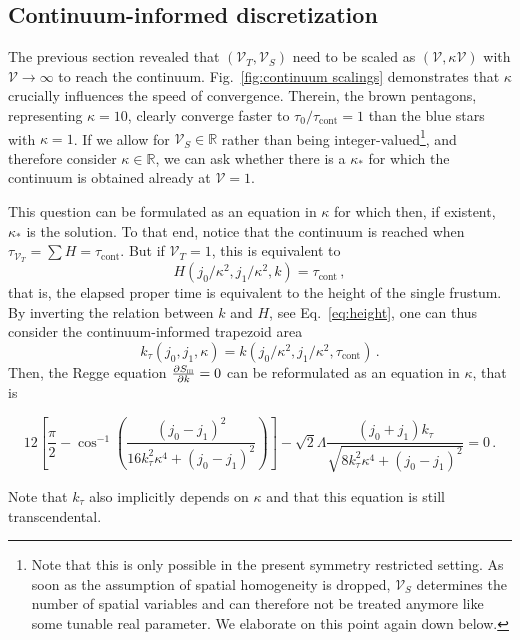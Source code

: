 \documentclass[amsmath,amssymb,aps,twocolumn,superscriptaddress,nofootinbib]{revtex4-1}
\newcommand{\R}{\mathbb{R}}
\begin{document}
\subsection{Continuum-informed discretization}

The previous section revealed that $(\mathcal{V}_T,\mathcal{V}_S)$ need to be scaled as $(\mathcal{V},\kappa\mathcal{V})$ with $\mathcal{V}\rightarrow\infty$ to reach the continuum.
Fig.~\ref{fig:continuum scalings} demonstrates that $\kappa$ crucially influences the speed of convergence. 
Therein, the brown pentagons, representing $\kappa=10$, clearly converge faster to $\tau_0/\tau_{\mathrm{cont}} = 1$ than the blue stars with $\kappa=1$. 
If we allow for $\mathcal{V}_S\in\R$ rather than being integer-valued\footnote{Note that this is only possible in the present symmetry restricted setting. As soon as the assumption of spatial homogeneity is dropped, $\mathcal{V}_S$ determines the number of spatial variables and can therefore not be treated anymore like some tunable real parameter. We elaborate on this point again down below.}, and therefore consider $\kappa\in\R$, we can ask whether there is a $\kappa_*$ for which the continuum is obtained already at $\mathcal{V}=1$.

This question can be formulated as an equation in $\kappa$ for which then, if existent, $\kappa_*$ is the solution.
To that end, notice that the continuum is reached when $\tau_{\mathcal{V}_T} = \sum H = \tau_{\mathrm{cont}}$. But if $\mathcal{V}_T=1$, this is equivalent to 
%
\begin{equation}\label{eq:height=tau}
  H(j_0 / \kappa^2, j_1 / \kappa^2, k) = \tau_{\mathrm{cont}}\,,
\end{equation}
%
that is, the elapsed proper time is equivalent to the height of the single frustum. 
By inverting the relation between $k$ and $H$, see Eq.~\eqref{eq:height}, one can thus consider the continuum-informed trapezoid area 
%
\begin{equation}
k_\tau(j_0, j_1, \kappa) = k(j_0 / \kappa^2, j_1 / \kappa^2, \tau_{\mathrm{cont}})\,.
\end{equation}
%
Then, the Regge equation $\pdv{S_\textsc{iii}}{k} = 0$ can be reformulated as an equation in $\kappa$, that is
%
\begin{widetext}
\begin{equation}\label{eq:kappa eq}
  12\left[\frac{\pi}{2} - \cos^{-1}\left(\frac{(j_0 - j_1)^2}{16k_\tau^2\kappa^4 + (j_0 - j_1)^2}\right)\right] - \sqrt{2}\Lambda \frac{(j_0+j_1)k_\tau}{\sqrt{8k_\tau^2\kappa^4+(j_0-j_1)^2}} = 0\,.
\end{equation}
\end{widetext}
%
Note that $k_\tau$ also implicitly depends on $\kappa$ and that this equation is still transcendental.
\end{document}
